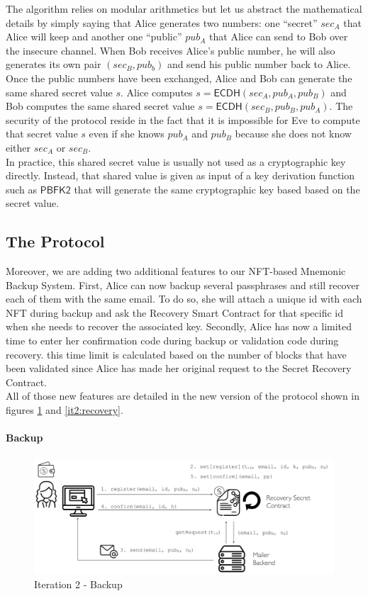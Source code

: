 \documentclass[12pt]{article}
\newcommand{\ms}[1]{\ensuremath{\mathsf{#1}}}
\begin{document}
The algorithm relies on modular arithmetics but let us abstract the mathematical details by simply saying that Alice generates two numbers: one ``secret'' $sec_A$ that Alice will keep and another one ``public'' $pub_A$ that Alice can send to Bob over the insecure channel. When Bob receives Alice's public number, he will also generates its own pair $(sec_B, pub_b)$ and send his public number back to Alice. Once the public numbers have been exchanged, Alice and Bob can generate the same shared secret value $s$. Alice computes $s=\ms{ECDH}(sec_A, pub_A, pub_B)$ and Bob computes the same shared secret value $s=\ms{ECDH}(sec_B, pub_B, pub_A)$. The security of the protocol reside in the fact that it is impossible for Eve to compute that secret value $s$ even if she knows $pub_A$ and $pub_B$ because she does not know either $sec_A$ or $sec_B$. \\

In practice, this shared secret value is usually not used as a cryptographic key directly. Instead, that shared value is given as input of a key derivation function such as $\ms{PBFK2}$ that will generate the same cryptographic key based based on the secret value. 

\subsection{The Protocol}

Moreover, we are adding two additional features to our NFT-based Mnemonic Backup System. First, Alice can now backup several passphrases and still recover each of them with the same email. To do so, she will attach a unique id with each NFT during backup and ask the Recovery Smart Contract for that specific id when she needs to recover the associated key. Secondly, Alice has now a limited time to enter her confirmation code during backup or validation code during recovery. this time limit is calculated based on the number of blocks that have been validated since Alice has made her original request to the Secret Recovery Contract. \\

All of those new features are detailed in the new version of the protocol shown in figures \ref{it2:backup} and \ref{it2:recovery}.

\paragraph{Backup}

\begin{figure}[h!]
  \includegraphics[width=\linewidth]{./media/media-003.png}
  \caption{Iteration 2 - Backup}
  \label{it2:backup}
\end{figure}
\end{document}
